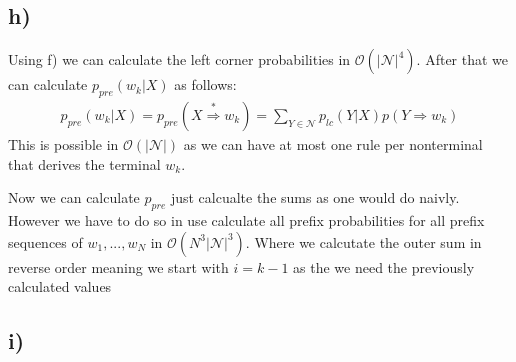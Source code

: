 \documentclass[a4paper,12pt]{ETHexercise}
\begin{document}
\subsection*{h)}
Using f) we can calculate the left corner probabilities in $\mathcal{O}(|\mathcal{N}|^4)$. After that we can calculate $p_{pre}(w_k|X)$ as follows:
\begin{align}
    p_{pre}(w_k|X) = p_{pre}(X \stackrel{*}{\Rightarrow} w_k) = \sum_{Y \in \mathcal{N}}p_{lc}(Y|X)p(Y \Rightarrow w_k)
\end{align}
This is possible in $\mathcal{O}(|\mathcal{N}|)$ as we can have at most one rule per nonterminal that derives the terminal $w_k$.

Now we can calculate $p_{pre}$ just calcualte the sums as one would do naivly.
However we have to do so in 
use calculate all prefix probabilities for all prefix sequences of $w_1,...,w_N$ in $\mathcal{O}(N^3|\mathcal{N}|^3)$. Where we calcutate the outer sum in reverse order meaning we start with $i=k-1$
as the we need the previously calculated values 


\subsection{i)}
\end{document}
